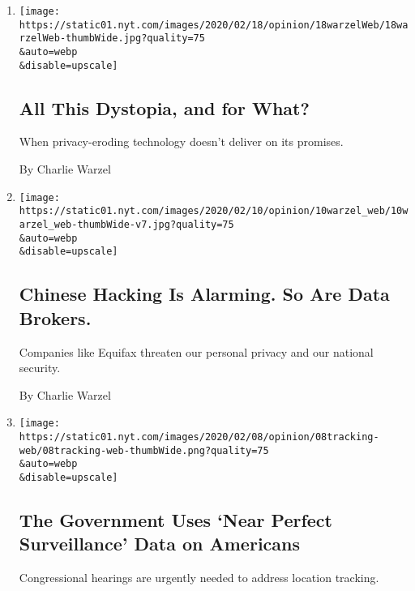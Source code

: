\begin{enumerate}
\def\labelenumi{\arabic{enumi}.}
\item
  \href{/2020/02/18/opinion/facial-recognition-surveillance-privacy.html}{}

  \texttt{[image: https://static01.nyt.com/images/2020/02/18/opinion/18warzelWeb/18warzelWeb-thumbWide.jpg?quality=75\\\&auto=webp\\\&disable=upscale]}

  \hypertarget{all-this-dystopia-and-for-what}{%
  \subsection{All This Dystopia, and for
  What?}\label{all-this-dystopia-and-for-what}}

  When privacy-eroding technology doesn't deliver on its promises.

  By Charlie Warzel
\item
  \href{/2020/02/10/opinion/equifax-breach-china-hacking.html}{}

  \texttt{[image: https://static01.nyt.com/images/2020/02/10/opinion/10warzel\_web/10warzel\_web-thumbWide-v7.jpg?quality=75\\\&auto=webp\\\&disable=upscale]}

  \hypertarget{chinese-hacking-is-alarming-so-are-data-brokers}{%
  \subsection{Chinese Hacking Is Alarming. So Are Data
  Brokers.}\label{chinese-hacking-is-alarming-so-are-data-brokers}}

  Companies like Equifax threaten our personal privacy and our national
  security.

  By Charlie Warzel
\item
  \href{/2020/02/07/opinion/dhs-cell-phone-tracking.html}{}

  \texttt{[image: https://static01.nyt.com/images/2020/02/08/opinion/08tracking-web/08tracking-web-thumbWide.png?quality=75\\\&auto=webp\\\&disable=upscale]}

  \hypertarget{the-government-uses-near-perfect-surveillance-data-on-americans}{%
  \subsection{The Government Uses `Near Perfect Surveillance' Data on
  Americans}\label{the-government-uses-near-perfect-surveillance-data-on-americans}}

  Congressional hearings are urgently needed to address location
  tracking.


\end{enumerate}
